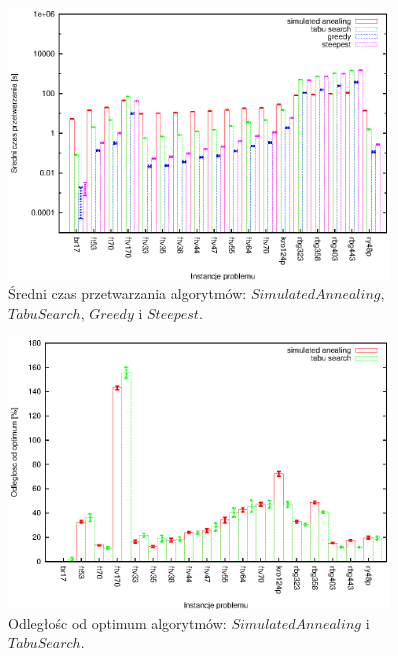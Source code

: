 \begin{figure}
\begin{center}
\includegraphics[width=0.9\textwidth]{wykresy/anealing_tabu_greedy_time_log}
\end{center}
\caption{Średni czas przetwarzania algorytmów: 
$Simulated Annealing$, $Tabu Search$, $Greedy$ i $Steepest$.}
\label{anealing_tabu_greedy_time_log}
\end{figure}

\begin{figure}
\begin{center}
\includegraphics[width=0.9\textwidth]{wykresy/anealing_tabu_quality}
\end{center}
\caption{Odległośc od optimum algorytmów: $Simulated Annealing$ i 
$Tabu Search$.}
\label{anealing_tabu_quality}
\end{figure}
